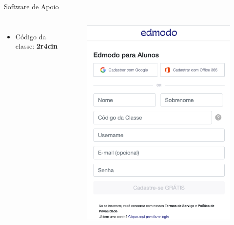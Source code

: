 \documentclass{beamer}
\begin{document}
\begin{frame}[allowframebreaks]{Software de Apoio}
    \begin{columns}
            \begin{itemize}
                \item Código da classe: \textbf{2r4cin}
            \end{itemize}
            \begin{figure}
                \includegraphics[scale=0.26]{Theme/Logos/edmodo_inicio_aluno.png}
            \end{figure}
    \end{columns}
    \framebreak


\end{frame}
\end{document}
